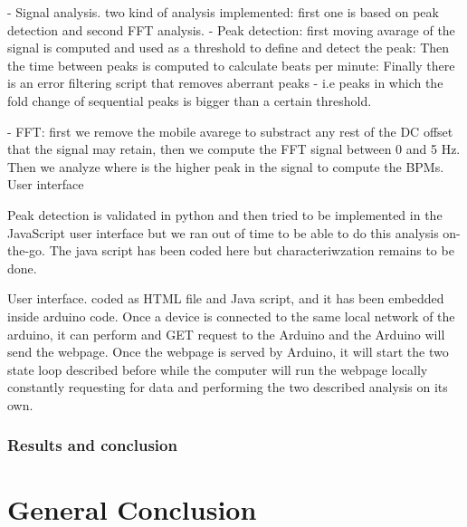 \documentclass[conference]{IEEEtran}
\begin{document}
          - Signal analysis. two kind of analysis implemented: first one is based on peak detection and second FFT analysis.
           - Peak detection: first moving avarage of the signal is computed and used as a threshold to define and detect the peak: Then the time between peaks is computed to calculate beats per minute:
           Finally there is an error filtering script that removes aberrant peaks - i.e peaks in which the fold change of sequential peaks is bigger than a certain threshold.

           - FFT: first we remove the mobile avarege to substract any rest of the DC offset that the signal may retain, then we compute the FFT signal between 0 and 5 Hz. Then we analyze where is the higher peak in the signal to compute the BPMs.
           User interface

           Peak detection is validated in python and then tried to be implemented in the JavaScript user interface but we ran out of time to be able to do this analysis on-the-go. 
           The java script has been coded here but characteriwzation remains to be done.

           User interface. coded as HTML file and Java script, and it has been embedded inside arduino code. Once a device is connected to the same local network of the arduino, it can perform and GET request to the Arduino and the Arduino will send the webpage.
           Once the webpage is served by Arduino, it will start the two state loop described before while the computer will run the webpage locally constantly requesting for data and performing the two described analysis on its own.


      \subsubsection{Results and conclusion}
\section{General Conclusion} %






\end{document}
